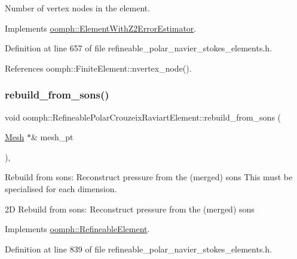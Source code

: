 Number of vertex nodes in the element. 



Implements \hyperlink{classoomph_1_1ElementWithZ2ErrorEstimator_a19495a0e77ef4ff35f15fdf7913b4077}{oomph\+::\+Element\+With\+Z2\+Error\+Estimator}.



Definition at line 657 of file refineable\+\_\+polar\+\_\+navier\+\_\+stokes\+\_\+elements.\+h.



References oomph\+::\+Finite\+Element\+::nvertex\+\_\+node().

\mbox{\label{classoomph_1_1RefineablePolarCrouzeixRaviartElement_aaf733531b51ac3ac642f5830b0e2eb3b}} 
\subsubsection{\texorpdfstring{rebuild\+\_\+from\+\_\+sons()}{rebuild\_from\_sons()}}
{\footnotesize\ttfamily void oomph\+::\+Refineable\+Polar\+Crouzeix\+Raviart\+Element\+::rebuild\+\_\+from\+\_\+sons (\begin{DoxyParamCaption}\item[{\hyperlink{classoomph_1_1Mesh}{Mesh} $\ast$\&}]{mesh\+\_\+pt }\end{DoxyParamCaption})\hspace{0.3cm}{\ttfamily [inline]}, {\ttfamily [virtual]}}



Rebuild from sons\+: Reconstruct pressure from the (merged) sons This must be specialised for each dimension. 

2D Rebuild from sons\+: Reconstruct pressure from the (merged) sons 

Implements \hyperlink{classoomph_1_1RefineableElement_a33324be27833fa4b78279d17158215fa}{oomph\+::\+Refineable\+Element}.



Definition at line 839 of file refineable\+\_\+polar\+\_\+navier\+\_\+stokes\+\_\+elements.\+h.



